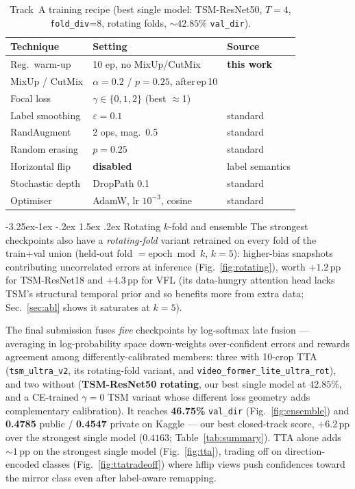 \documentclass[10pt,twocolumn,letterpaper]{article}
\makeatletter
\renewcommand\subsubsection{\@startsection{subsubsection}{3}{\z@}%
  {-3.25ex\@plus -1ex \@minus -.2ex}%
  {1.5ex \@plus .2ex}%
  {\normalfont\normalsize\bfseries}}
\makeatother
\begin{document}
\begin{table}[t]
\centering\small
\setlength{\tabcolsep}{4pt}
\begin{tabular}{@{}lll@{}}
\toprule
Technique & Setting & Source \\
\midrule
Reg.\ warm-up      & 10 ep, no MixUp/CutMix & \textbf{this work} \\
MixUp / CutMix     & $\alpha{=}0.2$ / $p{=}0.25$, after\,ep\,10 & \cite{zhang2018mixup,yun2019cutmix} \\
Focal loss         & $\gamma{\in}\{0,1,2\}$ (best $\approx$1) & \cite{lin2017focal} \\
Label smoothing    & $\varepsilon{=}0.1$ & standard \\
RandAugment        & 2 ops, mag.\ 0.5 & standard \\
Random erasing     & $p{=}0.25$ & standard \\
Horizontal flip    & \textbf{disabled} & label semantics \\
Stochastic depth   & DropPath 0.1 & standard \\
Optimiser          & AdamW, lr $10^{-3}$, cosine & standard \\
\bottomrule
\end{tabular}
\caption{Track~A training recipe (best single model: TSM-ResNet50, $T{=}4$,
\texttt{fold\_div}=8, rotating folds, ${\sim}42.85\%$ \texttt{val\_dir}).}
\label{tab:recipe}
\end{table}

\subsubsection{Rotating $k$-fold and ensemble}
\label{sec:rotating}
The strongest checkpoints also have a \emph{rotating-fold} variant retrained on
every fold of the train+val union (held-out fold $=\text{epoch}\bmod k$,
$k{=}5$): higher-bias snapshots contributing uncorrelated errors at inference
(Fig.~\ref{fig:rotating}), worth $+1.2$\,pp for TSM-ResNet18 and $+4.3$\,pp for
VFL (its data-hungry attention head lacks TSM's structural temporal prior and
so benefits more from extra data; Sec.~\ref{sec:abl} shows it saturates at
$k{=}5$).

The final submission fuses \emph{five} checkpoints by log-softmax late fusion
--- averaging in log-probability space down-weights over-confident errors and
rewards agreement among differently-calibrated members: three with 10-crop TTA
(\texttt{tsm\_ultra\_v2}, its rotating-fold variant, and
\texttt{video\_former\_lite\_ultra\_rot}), and two without (\textbf{TSM-ResNet50
rotating}, our best single model at $42.85\%$, and a CE-trained $\gamma{=}0$
TSM variant whose different loss geometry adds complementary calibration). It
reaches \textbf{46.75\%} \texttt{val\_dir} (Fig.~\ref{fig:ensemble}) and
\textbf{0.4785} public / \textbf{0.4547} private on Kaggle --- our best
closed-track score, $+6.2$\,pp over the strongest single model ($0.4163$;
Table~\ref{tab:summary}). TTA alone adds ${\sim}1$\,pp on the strongest single
model (Fig.~\ref{fig:tta}), trading off on direction-encoded classes
(Fig.~\ref{fig:ttatradeoff}) where hflip views push confidences toward the
mirror class even after label-aware remapping.
\end{document}
